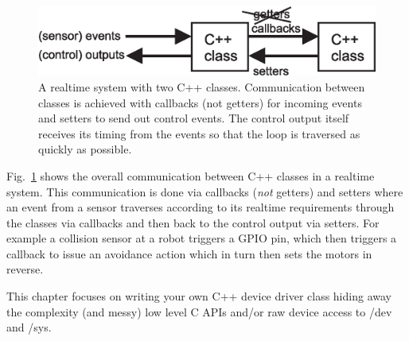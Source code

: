 \documentclass[12pt]{report}
\begin{document}
\begin{figure}[!hbt]
\begin{center}
\mbox{\includegraphics[width=\textwidth]{gettersetters}}
\end{center}
\caption{A realtime system with two C++ classes. Communication
  between classes is achieved with callbacks (not getters) for incoming events
  and setters to send out control events. The control output itself
  receives its timing from the events so that the loop is traversed
  as quickly as possible.
\label{gettersetters}}
\end{figure}
Fig.~\ref{gettersetters} shows the overall communication between C++
classes in a realtime system. This communication is done via callbacks
(\textsl{not} getters) and setters where an event from a sensor
traverses according to its realtime requirements through the classes via
callbacks and then back to the control output via setters. For example
a collision sensor at a robot triggers a GPIO pin, which then triggers a
callback to issue an avoidance action which in turn then sets the
motors in reverse.

This chapter focuses on writing your own C++ device driver class
hiding away the complexity (and messy) low level C APIs and/or raw
device access to /dev and /sys.
\end{document}
